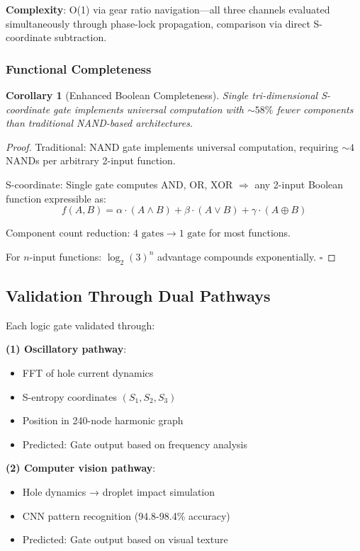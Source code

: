 \documentclass[11pt,a4paper]{article}
\newtheorem{corollary}[theorem]{Corollary}
\begin{document}
\textbf{Complexity}: O(1) via gear ratio navigation—all three channels evaluated simultaneously through phase-lock propagation, comparison via direct S-coordinate subtraction.

\subsubsection{Functional Completeness}

\begin{corollary}[Enhanced Boolean Completeness]
Single tri-dimensional S-coordinate gate implements universal computation with $\sim 58\%$ fewer components than traditional NAND-based architectures.
\end{corollary}

\begin{proof}
Traditional: NAND gate implements universal computation, requiring $\sim 4$ NANDs per arbitrary 2-input function.

S-coordinate: Single gate computes AND, OR, XOR $\Rightarrow$ any 2-input Boolean function expressible as:
\begin{equation}
f(A,B) = \alpha \cdot (A \land B) + \beta \cdot (A \lor B) + \gamma \cdot (A \oplus B)
\end{equation}

Component count reduction: $4 \text{ gates} \rightarrow 1 \text{ gate}$ for most functions.

For $n$-input functions: $\log_2(3)^n$ advantage compounds exponentially. $\square$
\end{proof}

\subsection{Validation Through Dual Pathways}

Each logic gate validated through:

\textbf{(1) Oscillatory pathway}:
\begin{itemize}
\item FFT of hole current dynamics
\item S-entropy coordinates $(S_1, S_2, S_3)$
\item Position in 240-node harmonic graph
\item Predicted: Gate output based on frequency analysis
\end{itemize}

\textbf{(2) Computer vision pathway}:
\begin{itemize}
\item Hole dynamics → droplet impact simulation
\item CNN pattern recognition (94.8-98.4\% accuracy)
\item Predicted: Gate output based on visual texture
\end{itemize}
\end{document}
